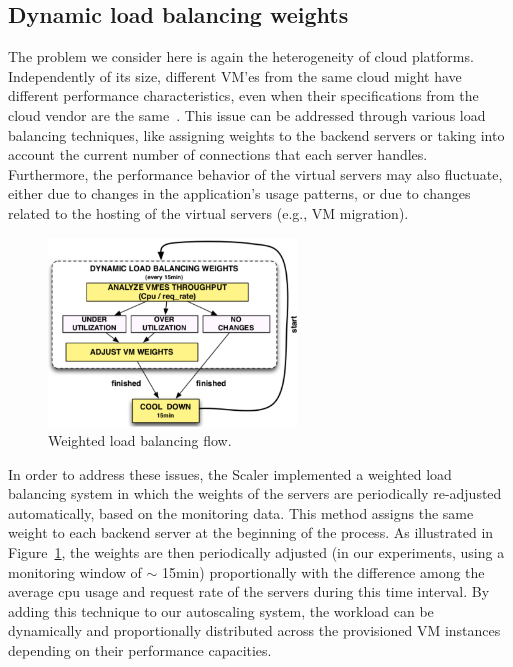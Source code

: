 


\subsection{Dynamic load balancing weights } 


The problem we consider here is again the heterogeneity of cloud platforms.
Independently of its size, different VM'es from the same cloud might have different performance
characteristics, even when their specifications from the cloud vendor are 
the same~\cite{ec2Performance}. This issue can be addressed through various 
load balancing techniques, like assigning weights to the backend servers or 
taking into account the current number of connections that each server 
handles. Furthermore, the performance behavior of the virtual servers may 
also fluctuate, either due to changes in the application's usage 
patterns, or due to changes related to the hosting of the virtual servers 
(e.g., VM migration).


\begin{figure}[htb]
  \begin{center}
    \includegraphics[height=5cm]{images/load_balancing}
  \end{center}
\vspace{-5mm}
  \caption{Weighted load balancing flow.}
  \label{fig:load_balancing}
\end{figure}


In order to address these issues, the Scaler implemented a weighted 
load balancing system in which the weights of the servers are 
periodically re-adjusted automatically, based on the monitoring data.  
This method assigns the same weight to each backend server at the 
beginning of the process. As illustrated in Figure~\ref{fig:load_balancing}, the weights are then periodically
adjusted (in our experiments, using a monitoring window of $\sim$ 15min) proportionally 
with the difference among the average cpu usage and request rate of the servers 
during this time interval. By adding this technique to our autoscaling system, 
the workload can be dynamically and proportionally distributed across the provisioned VM instances depending on their performance capacities.




